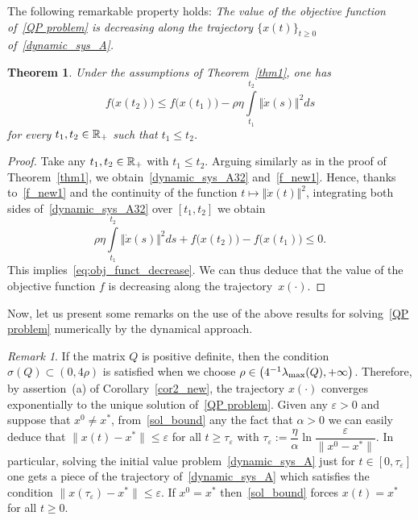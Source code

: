 \documentclass[11pt]{article}
\newtheorem{theorem}{Theorem}
\theoremstyle{definition}
\theoremstyle{remark}
\newtheorem{remark}{Remark}
\def\R{\Bbb R}
\begin{document}
The following remarkable property holds: \textit{The value of the objective function of~\eqref{QP problem} is decreasing along the trajectory $\{x(t)\}_{t\geq 0}$ of~\eqref{dynamic_sys_A}.}

\begin{theorem}\label{thm:nonincreasing}
	Under the assumptions of Theorem~\ref{thm1}, one has
	\begin{equation}\label{eq:obj_funct_decrease}
		f\big(x(t_2)\big)\leq f\big(x(t_1)\big) -\rho\eta \int\limits_{t_1}^{t_2}\Vert\dot{x}(s)\Vert^2ds
	\end{equation}
	for every $t_1, t_2 \in\R_+$ such that $t_1\leq t_2$.
\end{theorem}
\begin{proof}
Take any $t_1, t_2\in\R_+$ with $t_1\leq t_2$. Arguing similarly as in the proof of Theorem~\ref{thm1}, we obtain~\eqref{dynamic_sys_A32} and~\eqref{f_new1}. Hence, thanks to~\eqref{f_new1} and the continuity of the function $t\mapsto \Vert\dot{x}(t)\Vert^2$, integrating both sides of~\eqref{dynamic_sys_A32} over $[t_1,t_2]$ we obtain
$$\rho\eta \int\limits_{t_1}^{t_2}\Vert\dot{x}(s)\Vert^2ds + f\big(x(t_2)\big)-f\big(x(t_1)\big)\leq 0.$$
This implies~\eqref{eq:obj_funct_decrease}.
We can thus deduce that the value of the objective function $f$ is decreasing along the trajectory~$x(\cdot)$.
\end{proof}

Now, let us present some remarks on the use of the above results for solving~\eqref{QP problem} numerically by the dynamical approach. 


\begin{remark}\label{rem:1}
	\rm If the matrix $Q$ is positive definite, then the condition $\sigma(Q)\subset(0,4\rho)$ is satisfied when we choose $\rho\in \left(4^{-1}\lambda_{\rm max} (Q),+\infty\right)$. Therefore, by assertion~(a) of Corollary~\ref{cor2_new}, the trajectory $x(\cdot)$ converges exponentially to the unique solution of~\eqref{QP problem}. Given any $\varepsilon>0$ and suppose that $x^0\neq x^*$, from~\eqref{sol_bound} any the fact that $\alpha >0$ we can easily deduce that $\|x(t)-x^*\|\leq \varepsilon$ for all $t\geq \tau_\varepsilon$ with $ \tau_\varepsilon:=\dfrac{\eta}{\alpha}\ln\dfrac{\varepsilon}{\|x^0-x^*\|}$. In particular, solving the initial value problem~\eqref{dynamic_sys_A} just for $t\in[0,\tau_\varepsilon]$ one gets a piece of the trajectory of~\eqref{dynamic_sys_A} which satisfies the condition $\|x(\tau_\varepsilon)-x^*\|\leq \varepsilon$. If $x^0= x^*$ then~\eqref{sol_bound} forces $x(t)=x^*$ for all $t\geq 0$.
\end{remark}
\end{document}
